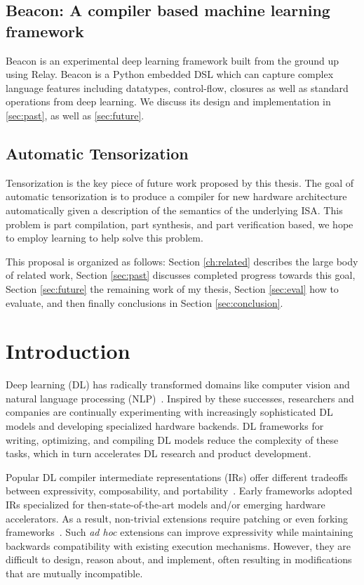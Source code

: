 \subsection{Beacon: A compiler based machine learning framework}

Beacon is an experimental deep learning framework built from the ground up
  using Relay.
Beacon is a Python embedded DSL which can capture
  complex language features including datatypes, control-flow, closures
  as well as standard operations from deep learning.
We discuss its design and implementation in \ref{sec:past}, as well as \ref{sec:future}.

\subsection{Automatic Tensorization}

Tensorization is the key piece of future work proposed by this thesis.
The goal of automatic tensorization is to produce a compiler for new
hardware architecture automatically given a description of the semantics
of the underlying ISA.
This problem is part compilation, part synthesis, and part verification based,
  we hope to employ learning to help solve this problem.

This proposal is organized as follows:
  Section \ref{ch:related} describes the large body of related work,
  Section \ref{sec:past} discusses completed progress towards this goal,
  Section \ref{sec:future} the remaining work of my thesis,
  Section \ref{sec:eval} how to evaluate,
  and then finally conclusions in Section \ref{sec:conclusion}.

  \section{Introduction}
\label{sec:intro}

Deep learning (DL) has radically transformed domains like
  computer vision and
  natural language processing (NLP)~\citep{yolo, recent_trends_in_nlp}.
Inspired by these successes,
  researchers and companies are continually
  experimenting with increasingly sophisticated DL models and
  developing specialized hardware backends.
DL frameworks for writing, optimizing, and compiling DL models
  reduce the complexity of these tasks,
  which in turn accelerates DL research and product development.

Popular DL compiler intermediate representations (IRs) offer different tradeoffs
  between expressivity, composability, and portability~\citep{
    tensorflow, pytorch_ad, chainer_learningsys2015, tangent, theano, glow}.
Early frameworks adopted IRs
  specialized for then-state-of-the-art models and/or
  emerging hardware accelerators.
As a result, non-trivial extensions require
  patching or even forking frameworks~\citep{
    tf_fold, tf_lite, tangent, tf_eager, xla, glow, torchscript}.
Such \textit{ad hoc} extensions can improve expressivity
  while maintaining backwards compatibility with existing execution mechanisms.
However, they are difficult to design, reason about, and implement,
  often resulting in modifications that are mutually incompatible.

